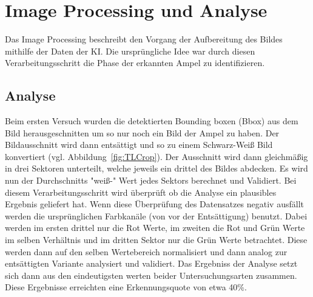 \documentclass[a4paper,oneside,12pt]{report}
\begin{document}
	\chapter{Image Processing und Analyse}
	\begin{onehalfspace}
		Das Image Processing beschreibt den Vorgang der Aufbereitung des Bildes mithilfe der Daten der KI. Die ursprüngliche Idee war durch diesen Verarbeitungsschritt die Phase der erkannten Ampel zu identifizieren. \newline 
		\section{Analyse}
		Beim ersten Versuch wurden die detektierten Bounding boxen (Bbox) aus dem Bild herausgeschnitten um so nur noch ein Bild der Ampel zu haben. Der Bildausschnitt wird dann entsättigt und so zu einem Schwarz-Weiß Bild konvertiert (vgl. Abbildung~\ref{fig:TLCrop}). Der Ausschnitt wird dann gleichmäßig in drei Sektoren unterteilt, welche jeweils ein drittel des Bildes abdecken. Es wird nun der Durchschnitts "weiß-" Wert jedes Sektors berechnet und Validiert. Bei diesem Verarbeitungsschritt wird überprüft ob die Analyse ein plausibles Ergebnis geliefert hat. Wenn diese Überprüfung des Datensatzes negativ ausfällt werden die ursprünglichen Farbkanäle (von vor der Entsättigung) benutzt. Dabei werden im ersten drittel nur die Rot Werte, im zweiten die Rot und Grün Werte im selben Verhältnis und im dritten Sektor nur die Grün Werte betrachtet. Diese werden dann auf den selben Wertebereich normalisiert und dann analog zur entsättigten Variante analysiert und validiert. Das Ergebniss der Analyse setzt sich dann aus den eindeutigsten werten beider Untersuchungsarten zusammen. \newline
		Diese Ergebnisse erreichten eine Erkennungsquote von etwa 40\%.

\end{onehalfspace}
\end{document}

